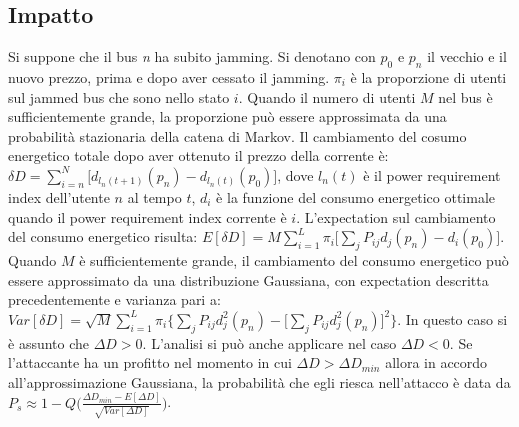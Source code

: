 \subsection{Impatto}
Si suppone che il bus \emph{n} ha subito jamming. Si denotano con $p_{0}$ e $p_{n}$ il vecchio e il nuovo prezzo, prima e dopo aver cessato il jamming. $\pi_{i}$ è la proporzione di utenti sul jammed bus che sono nello stato $i$. Quando il numero di utenti $M$ nel bus è sufficientemente grande, la proporzione può essere approssimata da una probabilità stazionaria della catena di Markov. Il cambiamento del cosumo energetico totale dopo aver ottenuto il prezzo della corrente è:\newline
\indent$\delta D = \sum\limits_{i=n}^{N} \Big[ d_{l_{n}(t+1)}(p_{n}) - d_{l_{n}(t)}(p_{0})\Big]$,\newline
dove $l_{n}(t)$ è il power requirement index dell'utente $n$ al tempo $t$, $d_{i}$ è la funzione del consumo energetico ottimale quando il power requirement index corrente è $i$. L'expectation sul cambiamento del consumo energetico risulta:\newline
\indent$E[\delta D] = M \sum\limits_{i=1}^{L} \pi_{i} \Big[\sum\limits_{j} P_{ij}d_{j}(p_{n}) - d_{i}(p_{0})\Big]$.\newline\newline
Quando $M$ è sufficientemente grande, il cambiamento del consumo energetico può essere approssimato da una distribuzione Gaussiana, con expectation descritta precedentemente e varianza pari a:\newline
\indent$Var[\delta D] = \sqrt{M} \sum\limits_{i=1}^{L} \pi_{i} \Big\{\sum\limits_{j}P_{ij}d_{j}^{2}(p_{n}) - \Big[\sum\limits_{j}P_{ij}d_{j}^{2}(p_{n})\Big]^2\Big\}$.\newpage
In questo caso si è assunto che $\Delta D > 0$. L'analisi si può anche applicare nel caso $\Delta D < 0$. Se l'attaccante ha un profitto nel momento in cui $\Delta D > \Delta D_{min}$ allora in accordo all'approssimazione Gaussiana, la probabilità che egli riesca nell'attacco è data da $P_{s} \approx 1 - Q \bigg(\frac{\Delta D_{min} - E[\Delta D]}{\sqrt{Var[\Delta D]}}\bigg)$.
